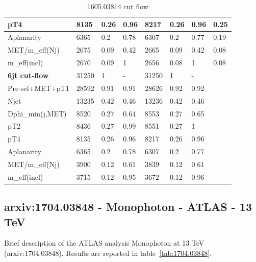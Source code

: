 \documentclass[11pt]{cernrep}
\begin{document}
\begin{table}[htbp]
\begin{tabular}{ | l || l | l | l || l | l | l || l | }
pT4               & 8135 & 0.26 & 0.96 & 8217 & 0.26 & 0.96 & 0.25  \\ \hline
Aplanarity        & 6365 & 0.2 & 0.78 & 6307 & 0.2 & 0.77 & 0.19  \\ \hline
MET/m\_eff(Nj)     & 2675 & 0.09 & 0.42 & 2665 & 0.09 & 0.42 & 0.08  \\ \hline
m\_eff(incl)       & 2670 & 0.09 & 1 & 2656 & 0.08 & 1 & 0.08  \\ \hline
\hline
{\bf 6jt cut-flow} & 31250 & 1 & - & 31250 & 1 & - & \   \\ \hline
Pre-sel+MET+pT1   & 28592 & 0.91 & 0.91 & 28626 & 0.92 & 0.92 & \   \\ \hline
Njet              & 13235 & 0.42 & 0.46 & 13236 & 0.42 & 0.46 & \   \\ \hline
Dphi\_min(j,MET)   & 8520 & 0.27 & 0.64 & 8553 & 0.27 & 0.65 & \   \\ \hline
pT2               & 8436 & 0.27 & 0.99 & 8551 & 0.27 & 1 & \   \\ \hline
pT4               & 8135 & 0.26 & 0.96 & 8217 & 0.26 & 0.96 & \   \\ \hline
Aplanarity        & 6365 & 0.2 & 0.78 & 6307 & 0.2 & 0.77 & \   \\ \hline
MET/m\_eff(Nj)     & 3900 & 0.12 & 0.61 & 3839 & 0.12 & 0.61 & \   \\ \hline
m\_eff(incl)       & 3715 & 0.12 & 0.95 & 3672 & 0.12 & 0.96 & \   \\ \hline

		\end{tabular}
	\caption{1605.03814 cut flow}
	\label{tab:1605.03814}
\end{table}

\subsection{arxiv:1704.03848 - Monophoton - ATLAS - 13 TeV}
Brief description of the ATLAS analysis Monophoton at 13 TeV (arxiv:1704.03848).
Results are reported in table~\ref{tab:1704.03848}.
\end{document}

